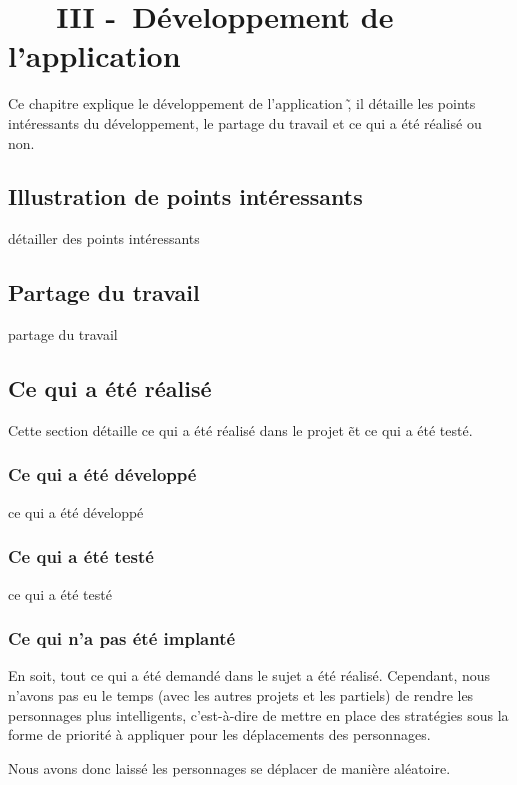 \chapter[~~~DÉVELOPPEMENT]{~~~III -~Développement de l’application}%
\label{refDev3}%

Ce chapitre explique le développement de l'application \nom\~, il détaille les points intéressants du développement, le partage du travail et ce qui a été réalisé ou non.

\section{Illustration de points intéressants}

\textcolor{cardinal}{détailler des points intéressants}


\section{Partage du travail}

\textcolor{cardinal}{partage du travail}


\section{Ce qui a été réalisé}

Cette section détaille ce qui a été réalisé dans le projet \nom\~et ce qui a été testé.

\subsection{Ce qui a été développé}

\textcolor{cardinal}{ce qui a été développé}


\subsection{Ce qui a été testé}

\textcolor{cardinal}{ce qui a été testé}


\subsection{Ce qui n'a pas été implanté}

En soit, tout ce qui a été demandé dans le sujet a été réalisé. Cependant, nous n'avons pas eu le temps (avec les autres projets et les partiels) de rendre les personnages plus intelligents, c'est-à-dire de mettre en place des stratégies sous la forme de priorité à appliquer pour les déplacements des personnages. 

Nous avons donc laissé les personnages se déplacer de manière aléatoire.